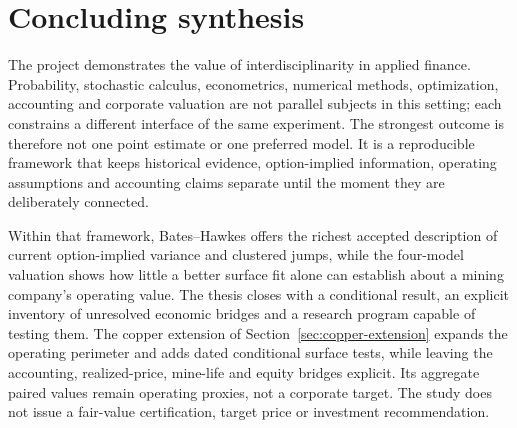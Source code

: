 \section*{Concluding synthesis}

The project demonstrates the value of interdisciplinarity in applied finance.
Probability, stochastic calculus, econometrics, numerical methods,
optimization, accounting and corporate valuation are not parallel subjects in
this setting; each constrains a different interface of the same experiment.
The strongest outcome is therefore not one point estimate or one preferred
model. It is a reproducible framework that keeps historical evidence,
option-implied information, operating assumptions and accounting claims
separate until the moment they are deliberately connected.

Within that framework, Bates--Hawkes offers the richest accepted
description of current option-implied variance and clustered jumps, while the
four-model valuation shows how little a better surface fit alone can establish
about a mining company's operating value. The thesis closes with a conditional result,
an explicit inventory of unresolved economic bridges and a research program
capable of testing them. The copper extension of
Section~\ref{sec:copper-extension} expands the operating perimeter and adds
dated conditional surface tests, while leaving the accounting, realized-price,
mine-life and equity bridges explicit. Its aggregate paired values remain
operating proxies, not a corporate target.
The study does not issue a fair-value certification, target
price or investment recommendation.

